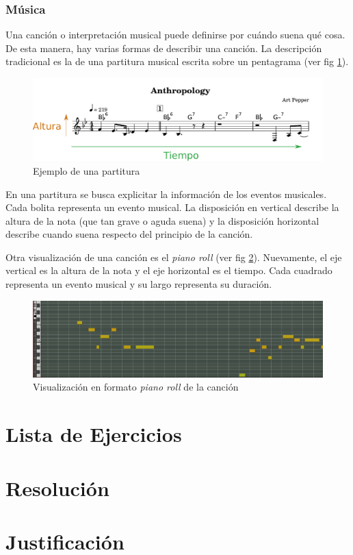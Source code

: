 \documentclass{article}
\begin{document}
\subsubsection{Música}

Una canción o interpretación musical puede definirse por cuándo suena qué
cosa. De esta manera, hay varias formas de describir una canción. La
descripción tradicional es la de una partitura musical escrita sobre un
pentagrama (ver fig \ref{fig:part}).

\begin{figure}[h]
\centering
\includegraphics[width=\textwidth]{graficos/partitura.pdf}
\caption{Ejemplo de una partitura}\label{fig:part}
\end{figure}

En una partitura se busca explicitar la información de los eventos musicales.
Cada bolita representa un evento musical. La disposición en vertical describe
la altura de la nota (que tan grave o aguda suena) y la disposición horizontal
describe cuando suena respecto del principio de la canción.

Otra visualización de una canción es el \emph{piano roll} (ver fig
\ref{fig:piano_roll}). Nuevamente, el eje vertical es la altura de la nota y
el eje horizontal es el tiempo. Cada cuadrado representa un evento musical y
su largo representa su duración.

\begin{figure}[h]
\centering
\includegraphics[width=\textwidth]{graficos/piano_roll.png}
\caption{Visualización en formato \emph{piano roll} de la
canción}\label{fig:piano_roll}
\end{figure}

\section{Lista de Ejercicios}

\section{Resolución}

\section{Justificación}
\end{document}
